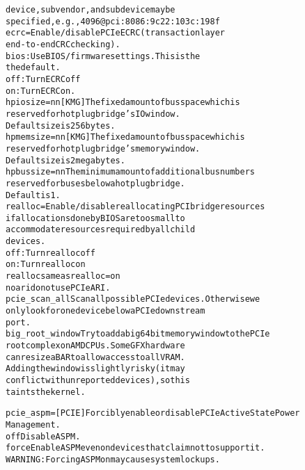 \documentclass[a4paper,8pt,english]{sphinxmanual}
\begin{document}
\begin{alltt}
                                device, subvendor, and subdevice may be
                                specified, e.g., 4096@pci:8086:9c22:103c:198f
                ecrc=           Enable/disable PCIe ECRC (transaction layer
                                end-to-end CRC checking).
                                bios: Use BIOS/firmware settings. This is the
                                the default.
                                off: Turn ECRC off
                                on: Turn ECRC on.
                hpiosize=nn{[}KMG{]}        The fixed amount of bus space which is
                                reserved for hotplug bridge's IO window.
                                Default size is 256 bytes.
                hpmemsize=nn{[}KMG{]}       The fixed amount of bus space which is
                                reserved for hotplug bridge's memory window.
                                Default size is 2 megabytes.
                hpbussize=nn    The minimum amount of additional bus numbers
                                reserved for buses below a hotplug bridge.
                                Default is 1.
                realloc=        Enable/disable reallocating PCI bridge resources
                                if allocations done by BIOS are too small to
                                accommodate resources required by all child
                                devices.
                                off: Turn realloc off
                                on: Turn realloc on
                realloc         same as realloc=on
                noari           do not use PCIe ARI.
                pcie\_scan\_all   Scan all possible PCIe devices.  Otherwise we
                                only look for one device below a PCIe downstream
                                port.
                big\_root\_window Try to add a big 64bit memory window to the PCIe
                                root complex on AMD CPUs. Some GFX hardware
                                can resize a BAR to allow access to all VRAM.
                                Adding the window is slightly risky (it may
                                conflict with unreported devices), so this
                                taints the kernel.

        pcie\_aspm=      {[}PCIE{]} Forcibly enable or disable PCIe Active State Power
                        Management.
                off     Disable ASPM.
                force   Enable ASPM even on devices that claim not to support it.
                        WARNING: Forcing ASPM on may cause system lockups.


\end{alltt}
\end{document}
